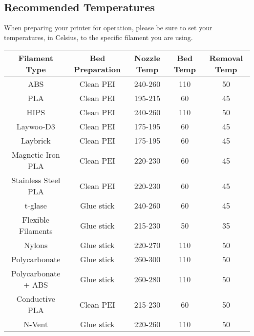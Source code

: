 
\subsection{Recommended Temperatures}
When preparing your printer for operation, please be sure to set your temperatures, in Celsius, to the specific filament you are using. 
\begin{center}
 \hspace*{-1.5cm}\begin{tabular}{||c c c c c||} 
 \hline
 Filament Type & Bed Preparation & Nozzle Temp & Bed Temp & Removal Temp \\ [0.5ex] 
 \hline\hline
 ABS & Clean PEI & 240-260 & 110 & 50 \\ 
 \hline
 PLA & Clean PEI & 195-215 & 60 & 45 \\
 \hline
 HIPS & Clean PEI & 240-260 & 110 & 50\\
 \hline
 Laywoo-D3 & Clean PEI & 175-195 & 60 & 45 \\
 \hline
 Laybrick & Clean PEI & 175-195 & 60 & 45 \\
 \hline 
 Magnetic Iron PLA & Clean PEI & 220-230 & 60 & 45 \\
 \hline
 Stainless Steel PLA & Clean PEI & 220-230 & 60 & 45 \\
 \hline
 t-glase & Glue stick & 240-260 & 60 & 45 \\
 \hline
 Flexible Filaments & Glue stick & 215-230 & 50 & 35 \\  
 \hline
 Nylons & Glue stick & 220-270 & 110 & 50 \\
 \hline
 Polycarbonate & Glue stick & 260-300 & 110 & 50 \\ 
 \hline
 Polycarbonate + ABS & Glue stick & 260-280 & 110 & 50 \\
 \hline 
 Conductive PLA & Clean PEI & 215-230 & 60 & 50 \\
 \hline
 N-Vent & Glue stick & 220-260 & 110 & 50 \\ [1ex]
 \hline
 
\end{tabular}
\end{center}

